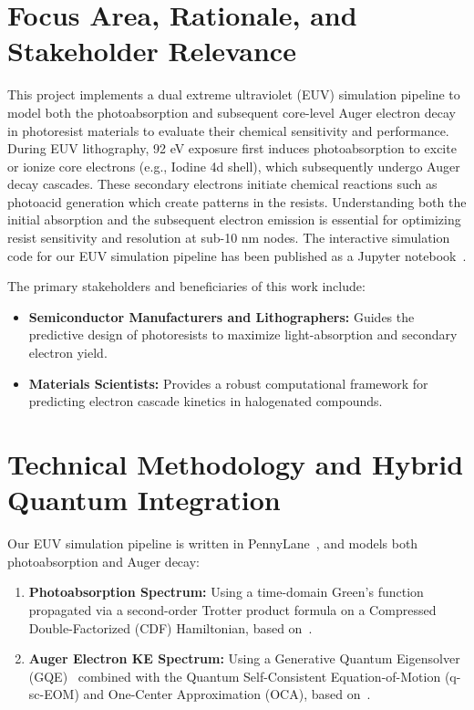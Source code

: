 \documentclass[11pt]{article}
\begin{document}


\section{Focus Area, Rationale, and Stakeholder Relevance}
This project implements a dual extreme ultraviolet (EUV) simulation pipeline to model both the photoabsorption and subsequent core-level Auger electron decay in photoresist materials to evaluate their chemical sensitivity and performance. During EUV lithography, 92 eV exposure first induces photoabsorption to excite or ionize core electrons (e.g., Iodine 4d shell), which subsequently undergo Auger decay cascades. These secondary electrons initiate chemical reactions such as photoacid generation which create patterns in the resists. Understanding both the initial absorption and the subsequent electron emission is essential for optimizing resist sensitivity and resolution at sub-10 nm nodes. The interactive simulation code for our EUV simulation pipeline has been published as a Jupyter notebook~\cite{mb_notebook}.

The primary stakeholders and beneficiaries of this work include:
\begin{itemize}[leftmargin=*,noitemsep,topsep=0pt]
  \item \textbf{Semiconductor Manufacturers and Lithographers:} Guides the predictive design of photoresists to maximize light-absorption and secondary electron yield.
  \item \textbf{Materials Scientists:} Provides a robust computational framework for predicting electron cascade kinetics in halogenated compounds.
\end{itemize}

\section{Technical Methodology and Hybrid Quantum Integration}
Our EUV simulation pipeline is written in PennyLane~\cite{pennylane2018}, and models both photoabsorption and Auger decay:
\begin{enumerate}[leftmargin=*,noitemsep,topsep=0pt]
  \item \textbf{Photoabsorption Spectrum:} Using a time-domain Green's function propagated via a second-order Trotter product formula on a Compressed Double-Factorized (CDF) Hamiltonian, based on~\cite{kharazi2026}.
  \item \textbf{Auger Electron KE Spectrum:} Using a Generative Quantum Eigensolver (GQE)~\cite{gqe2024} combined with the Quantum Self-Consistent Equation-of-Motion (q-sc-EOM) and One-Center Approximation (OCA), based on~\cite{keithley2026}.
\end{enumerate}
\end{document}
